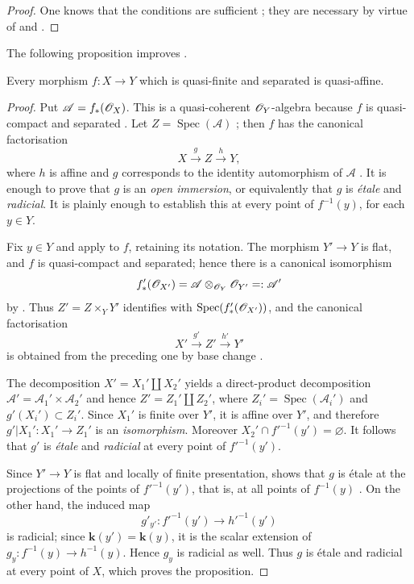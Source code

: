 \begin{proof}
One knows that the conditions are sufficient ; they are necessary by virtue of  and .
\end{proof}

The following proposition improves .

\begin{proposition}[18.12.12]
\label{IV.18.12.12}
Every morphism $f:X\to Y$ which is quasi-finite and separated is quasi-affine.
\end{proposition}

\begin{proof}
Put $\mathscr{A}=f_*(\mathscr{O}_X)$. This is a quasi-coherent $\mathscr{O}_Y$-algebra because $f$ is quasi-compact and separated . Let $Z=\operatorname{Spec}(\mathscr{A})$ ; then $f$ has the canonical factorisation
\[
  X\xrightarrow{g}Z\xrightarrow{h}Y,
\]
where $h$ is affine and $g$ corresponds to the identity automorphism of $\mathscr{A}$ . It is enough to prove that $g$ is an \emph{open immersion}, or equivalently  that $g$ is \emph{\'etale} and \emph{radicial}. It is plainly enough to establish this at every point of $f^{-1}(y)$, for each $y\in Y$.

Fix $y\in Y$ and apply  to $f$, retaining its notation. The morphism $Y'\to Y$ is flat, and $f$ is quasi-compact and separated; hence there is a canonical isomorphism
\[
  f'_*(\mathscr{O}_{X'})
  =\mathscr{A}\otimes_{\mathscr{O}_Y}\mathscr{O}_{Y'}
  =:\mathscr{A}'
\]
by . Thus $Z'=Z\times_{Y}Y'$ identifies with $\operatorname{Spec}(f'_*(\mathscr{O}_{X'}))$, and the canonical factorisation
\[
  X'\xrightarrow{g'}Z'\xrightarrow{h'}Y'
\]
is obtained from the preceding one by base change .

The decomposition $X'=X_1'\amalg X_2'$ yields a direct-product decomposition $\mathscr{A}'=\mathscr{A}_1'\times\mathscr{A}_2'$ and hence $Z'=Z_1'\amalg Z_2'$, where $Z_i'=\operatorname{Spec}(\mathscr{A}_i')$ and $g'(X_i')\subset Z_i'$. Since $X_1'$ is finite over $Y'$, it is affine over $Y'$, and therefore $g'|X_1':X_1'\to Z_1'$ is an \emph{isomorphism}. Moreover $X_2'\cap f'^{-1}(y')=\varnothing$. It follows that $g'$ is \emph{\'etale} and \emph{radicial} at every point of $f'^{-1}(y')$.

Since $Y'\to Y$ is flat and locally of finite presentation,  shows that $g$ is \'etale at the projections of the points of $f'^{-1}(y')$, that is, at all points of $f^{-1}(y)$ . On the other hand, the induced map
\[
  g'_{y'}:f'^{-1}(y')\longrightarrow h'^{-1}(y')
\]
is radicial; since $\boldsymbol{k}(y')=\boldsymbol{k}(y)$, it is the scalar extension of $g_y:f^{-1}(y)\to h^{-1}(y)$. Hence $g_y$ is radicial as well. Thus $g$ is \'etale and radicial at every point of $X$, which proves the proposition.
\end{proof}

